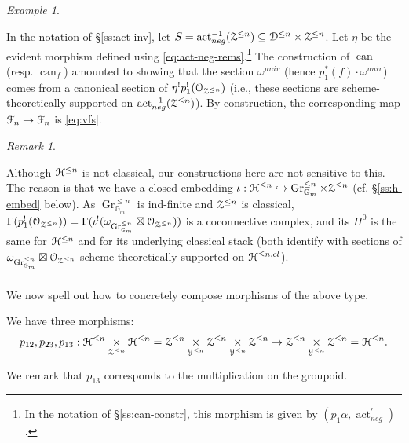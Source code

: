 \documentclass[reqno,11pt]{amsart}
\numberwithin{equation}{subsection}
\theoremstyle{remark}
\newtheorem{rem}[thm]{Remark}
\newtheorem{example}[thm]{Example}
\newcommand{\into}{\hookrightarrow}
\newcommand{\bG}{{\mathbb G}}
\newcommand{\sD}{{\EuScript D}}
\newcommand{\sF}{{\EuScript F}}
\newcommand{\sH}{{\EuScript H}}
\newcommand{\sO}{{\EuScript O}}
\newcommand{\sY}{{\EuScript Y}}
\newcommand{\sZ}{{\EuScript Z}}
\newcommand{\on}{\operatorname}
\newcommand{\act}{\on{act}}
\newcommand{\Gr}{\on{Gr}}
\renewcommand{\subset}{\subseteq}
\begin{document}
\begin{example}\label{e:vfs}

In the notation of \S \ref{ss:act-inv}, let 
$S = \act_{neg}^{-1}(\sZ^{\leq n}) \subset \sD^{\leq n} \times \sZ^{\leq n}$.
Let $\eta$ be the evident morphism defined using \eqref{eq:act-neg-rems}.\footnote{In the notation of \S \ref{ss:can-constr}, this 
morphism is given by $(p_1\alpha,\act_{neg}^{\prime})$.}
The construction of $\on{can}$ (resp. $\on{can}_f$) amounted to showing
that the section $\omega^{univ}$ (hence $p_1^*(f)\cdot \omega^{univ}$) 
comes from a canonical section of
$\eta^!p_1^!(\sO_{\sZ^{\leq n}})$ (i.e., these sections are scheme-theoretically
supported on $\act_{neg}^{-1}(\sZ^{\leq n}) $). By construction,
the corresponding map $\sF_n \to \sF_n$ is \eqref{eq:vfs}.

\end{example}

\begin{rem}\label{r:h-cl}

Although 
$\sH^{\leq n}$ is not classical, our constructions
here are not sensitive to this. The reason is that
we have a closed embedding $\iota:\sH^{\leq n} \into 
\Gr_{\bG_m}^{\leq n} \times \sZ^{\leq n}$ 
(cf. \S \ref{ss:h-embed} below). As 
$\Gr_{\bG_m}^{\leq n}$ is ind-finite and 
$\sZ^{\leq n}$ is classical, 
$\Gamma(p_1^!(\sO_{\sZ^{\leq n}})) = \Gamma(\iota^!(\omega_{\Gr_{\bG_m}^{\leq n}}
\boxtimes \sO_{\sZ^{\leq n}}))$ is a coconnective complex,
and its $H^0$ is the same for $\sH^{\leq n}$ and for its
underlying classical stack (both identify with 
sections of $\omega_{\Gr_{\bG_m}^{\leq n}}
\boxtimes \sO_{\sZ^{\leq n}}$ scheme-theoretically supported
on $\sH^{\leq n,cl}$).

\end{rem}

\subsubsection{}\label{ss:sigma-comp}

We now spell out how to concretely compose morphisms of the above type.

We have three morphisms:
%
\[
p_{12},p_{23},p_{13}:
\sH^{\leq n} \underset{\sZ^{\leq n}}{\times} \sH^{\leq n} = 
\sZ^{\leq n} \underset{\sY^{\leq n}}{\times}
\sZ^{\leq n} \underset{\sY^{\leq n}}{\times} \sZ^{\leq n}
\to 
\sZ^{\leq n} \underset{\sY^{\leq n}}{\times} \sZ^{\leq n} =
\sH^{\leq n}.
\]

\noindent We remark that $p_{13}$ corresponds to the multiplication
on the groupoid.
\end{document}
